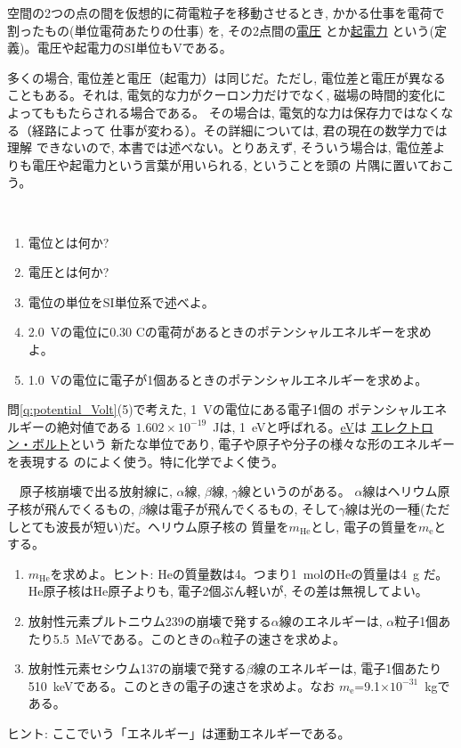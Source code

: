 空間の2つの点の間を仮想的に荷電粒子を移動させるとき, 
かかる仕事を電荷で割ったもの(単位電荷あたりの仕事)
を, その2点間の\underline{電圧}
とか\underline{起電力}
という(定義)。電圧や起電力のSI単位もVである。

多くの場合, 電位差と電圧（起電力）は同じだ。ただし, 
電位差と電圧が異なることもある。それは, 電気的な力がクーロン力だけでなく, 
磁場の時間的変化によってももたらされる場合である。
その場合は, 電気的な力は保存力ではなくなる（経路によって
仕事が変わる）。その詳細については, 君の現在の数学力では理解
できないので, 本書では述べない。とりあえず, そういう場合は, 
電位差よりも電圧や起電力という言葉が用いられる, ということを頭の
片隅に置いておこう。

\begin{q}\label{q:potential_Volt}　
\begin{enumerate}
\item 電位とは何か?
\item 電圧とは何か?
\item 電位の単位をSI単位系で述べよ。
\item 2.0~Vの電位に0.30 Cの電荷があるときのポテンシャルエネルギーを求めよ。
\item 1.0~Vの電位に電子が1個あるときのポテンシャルエネルギーを求めよ。
\end{enumerate}
\end{q}
\mv

問\ref{q:potential_Volt}(5)で考えた, 1~Vの電位にある電子1個の
ポテンシャルエネルギーの絶対値である
$1.602\times 10^{-19}$~Jは, 1~eVと呼ばれる。\underline{eV}は
\underline{エレクトロン・ボルト}という
新たな単位であり, 電子や原子や分子の様々な形のエネルギーを表現する
のによく使う。特に化学でよく使う。\mv

\begin{q}\label{q:radiation_eV}　原子核崩壊で出る放射線に, 
$\alpha$線, $\beta$線, $\gamma$線というのがある。
$\alpha$線はヘリウム原子核が飛んでくるもの, $\beta$線は電子が飛んでくるもの, 
そして$\gamma$線は光の一種(ただしとても波長が短い)だ。ヘリウム原子核の
質量を$m_{\text{He}}$とし, 電子の質量を$m_{\text{e}}$とする。
\begin{enumerate}
\item $m_{\text{He}}$を求めよ。ヒント: Heの質量数は4。つまり1~molのHeの質量は4~g
だ。He原子核はHe原子よりも, 電子2個ぶん軽いが, その差は無視してよい。
\item 放射性元素プルトニウム239の崩壊で発する$\alpha$線のエネルギーは, 
$\alpha$粒子1個あたり5.5~MeVである。このときの$\alpha$粒子の速さを求めよ。
\item 放射性元素セシウム137の崩壊で発する$\beta$線のエネルギーは, 
電子1個あたり510~keVである。このときの電子の速さを求めよ。なお
$m_{\text{e}}$=9.1$\times 10^{-31}$~kgである。
\end{enumerate}
ヒント: ここでいう「エネルギー」は運動エネルギーである。
\end{q}
\hv





